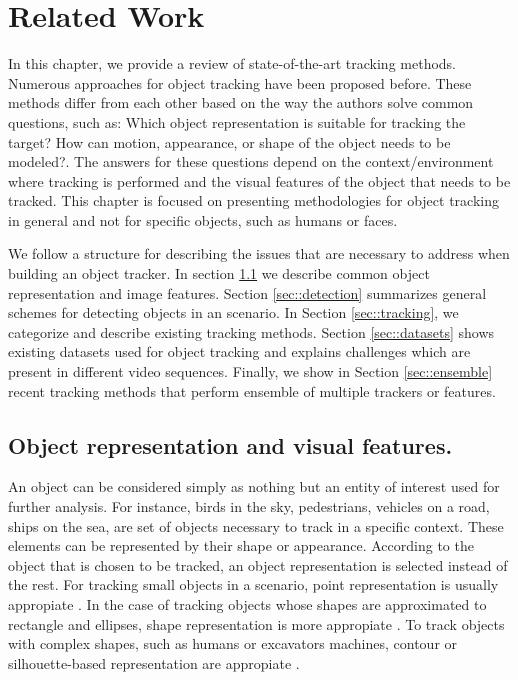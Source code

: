 \chapter{Related Work} %

\label{chapter2} %


In this chapter, we provide a review of state-of-the-art tracking methods.
Numerous approaches for object tracking have been proposed before. These methods
differ from each other based on the way the authors solve common questions, such
as: Which object representation is suitable for tracking the target? How can
motion, appearance, or shape of the object needs to be modeled?. The answers 
for these questions depend on the context/environment where tracking is
performed and the visual features of the object that needs to be tracked. This
chapter is focused on presenting methodologies for object tracking in general
and not for specific objects, such as humans or faces.

We follow a structure for describing the issues that are necessary to address
when building an object tracker. In section \ref{sec::object_representation} we
describe common object representation and image features. Section
\ref{sec::detection} summarizes general schemes for detecting objects in an
scenario. In Section \ref{sec::tracking}, we categorize and describe
existing tracking methods. Section \ref{sec::datasets} shows existing
datasets used for object tracking and explains challenges which are present
in different video sequences. Finally, we show in Section \ref{sec::ensemble}
recent tracking methods that perform ensemble of multiple trackers or features.

\section{Object representation and visual features.}
\label{sec::object_representation}

An object can be considered simply as nothing but an entity of interest used for
further analysis. For instance, birds in the sky, pedestrians, vehicles on a
road, ships on the sea, are set of objects necessary to track in a specific
context. These elements can be represented by their shape or appearance.
According to the object that is chosen to be tracked, an object representation
is selected instead of the rest. For tracking small objects
in a scenario, point representation is usually appropiate
\cite{Veenman2001,Shafique2005}. In the case of tracking objects whose shapes
are approximated to rectangle and ellipses, shape representation is more
appropiate \cite{Comaniciu2003a}. To track objects with complex shapes, such
as humans or excavators machines, contour or silhouette-based representation are
appropiate \cite{Haritaoglu2000}.

